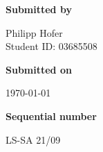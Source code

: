 \vspace*{1.3mm}
\textbf{Submitted by}\tab
\begin{minipage}[t]{\textwidth}
Philipp Hofer\\
Student ID: 03685508\strut
\end{minipage}

\vspace*{1.3mm}
\textbf{Submitted on}\tab 
\begin{minipage}[t]{\textwidth}
\today\strut
\end{minipage}

\vspace*{1.3mm}
\textbf{Sequential number}\tab 
\begin{minipage}[t]{\textwidth}
LS-SA 21/09
\end{minipage}

\restoregeometry